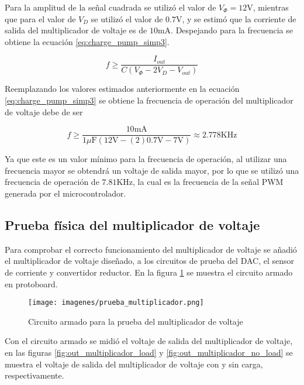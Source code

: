     Para la amplitud de la señal cuadrada se utilizó el valor de 
    $V_\Phi = 12 \text{V}$, mientras que para 
    el valor de $V_D$ se utilizó el valor de $0.7\text{V}$, y se estimó que
    la corriente de salida del multiplicador de voltaje es de $10\text{mA}$.
    Despejando para la frecuencia se obtiene la ecuación \ref{eq:charge_pump_simp3}.

    \begin{equation}
        f \geq \frac{I_{out}}{C(V_\Phi - 2V_D - V_{out})}
        \label{eq:charge_pump_simp3}
    \end{equation}

    Reemplazando los valores estimados anteriormente en la ecuación \ref{eq:charge_pump_simp3} se obtiene
    la frecuencia de operación del multiplicador de voltaje debe de ser 

        $$
            f \geq \frac{10\text{mA}}{1\mu\text{F}(12\text{V} - (2)0.7\text{V}
             - 7\text{V})} \approx 2.778\text{KHz}
        $$

    Ya que este es un valor mínimo para la frecuencia de operación, al utilizar
    una frecuencia mayor se obtendrá un voltaje de salida mayor, por lo que se
    utilizó una frecuencia de operación de $7.81\text{KHz}$, la cual es la
    frecuencia de la señal PWM generada por el microcontrolador.

    \subsection{Prueba física del multiplicador de voltaje}

    Para comprobar el correcto funcionamiento del multiplicador de voltaje
    se añadió el multiplicador de voltaje diseñado, a los circuitos de prueba
    del DAC, el sensor de corriente  y convertidor reductor. En la figura
    \ref{fig:prueba_multiplicador} se muestra el circuito armado en protoboard.
    
    \begin{figure}[H]
        \centering
        \texttt{[image: imagenes/prueba\_multiplicador.png]}
        \caption{Circuito armado para la prueba del multiplicador de voltaje}
        \label{fig:prueba_multiplicador}
    \end{figure}

    Con el circuito armado se midió el voltaje de salida del multiplicador
    de voltaje, en las figuras \ref{fig:out_multiplicador_load} y \ref{fig:out_multiplicador_no_load}
    se muestra el voltaje de salida del multiplicador de voltaje con y sin carga,
    respectivamente.


